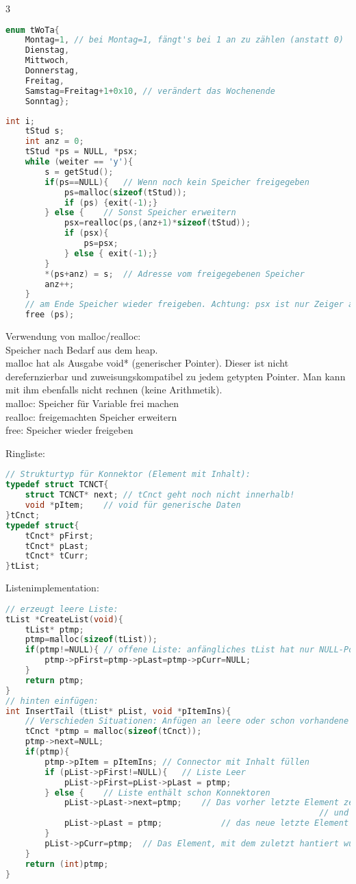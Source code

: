 \begin{multicols}{3}

\begin{lstlisting}[language=C]
enum tWoTa{
	Montag=1, // bei Montag=1, fängt's bei 1 an zu zählen (anstatt 0)
	Dienstag, 
	Mittwoch, 
	Donnerstag,
	Freitag,
	Samstag=Freitag+1+0x10,	// verändert das Wochenende
	Sonntag};
\end{lstlisting}
\HRule[4pt]
\begin{lstlisting}[language=C]
	int i;
	tStud s;
	int anz = 0;
	tStud *ps = NULL, *psx;
	while (weiter == 'y'){
		s = getStud();
		if(ps==NULL){	// Wenn noch kein Speicher freigegeben
			ps=malloc(sizeof(tStud));	
			if (ps) {exit(-1);}
		} else {	// Sonst Speicher erweitern
			psx=realloc(ps,(anz+1)*sizeof(tStud));
			if (psx){
				ps=psx;
			} else { exit(-1);}
		}		
		*(ps+anz) = s;	// Adresse vom freigegebenen Speicher
		anz++;
	}
	// am Ende Speicher wieder freigeben. Achtung: psx ist nur Zeiger auf ps
	free (ps);
\end{lstlisting}
Verwendung von malloc/realloc:\\
Speicher nach Bedarf aus dem heap.\\
malloc hat als Ausgabe void* (generischer Pointer). Dieser ist nicht derefernzierbar und zuweisungskompatibel zu jedem getypten Pointer. Man kann mit ihm ebenfalls nicht rechnen (keine Arithmetik).\\
malloc: Speicher für Variable frei machen\\
realloc: freigemachten Speicher erweitern\\
free: Speicher wieder freigeben
\HRule[4pt]

Ringliste:
\begin{lstlisting}[language=C]
// Strukturtyp für Konnektor (Element mit Inhalt):
typedef struct TCNCT{
	struct TCNCT* next;	// tCnct geht noch nicht innerhalb!
	void *pItem;	// void für generische Daten
}tCnct;
typedef struct{
	tCnct* pFirst;
	tCnct* pLast;
	tCnct* tCurr;
}tList;
\end{lstlisting}
Listenimplementation:
\begin{lstlisting}[language=C]
// erzeugt leere Liste:
tList *CreateList(void){
	tList* ptmp;
	ptmp=malloc(sizeof(tList));
	if(ptmp!=NULL){	// offene Liste: anfängliches tList hat nur NULL-Pointer
		ptmp->pFirst=ptmp->pLast=ptmp->pCurr=NULL;
	}
	return ptmp;
}
// hinten einfügen:
int InsertTail (tList* pList, void *pItemIns){
	// Verschieden Situationen: Anfügen an leere oder schon vorhandene Liste
	tCnct *ptmp = malloc(sizeof(tCnct));
	ptmp->next=NULL;
	if(ptmp){
		ptmp->pItem = pItemIns;	// Connector mit Inhalt füllen
		if (pList->pFirst!=NULL){	// Liste Leer
			pList->pFirst=pList->pLast = ptmp;
		} else {	// Liste enthält schon Konnektoren
			pList->pLast->next=ptmp;	// Das vorher letzte Element zeigt nun auf das eingefügte
																// und damit neue letzte Element
			pList->pLast = ptmp;			// das neue letzte Element
		}
		pList->pCurr=ptmp;	// Das Element, mit dem zuletzt hantiert wurde ist pCurr
	}
	return (int)ptmp;
}
\end{lstlisting}


\end{multicols}

